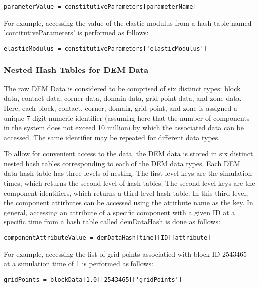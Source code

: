 \begin{lstlisting}[frame=single]
parameterValue = constitutiveParameters[parameterName]
\end{lstlisting}

For example, accessing the value of the elastic modulus from a hash table named 'contitutiveParameters' is performed as follows:

\begin{lstlisting}[frame=single]
elasticModulus = constitutiveParameters['elasticModulus']
\end{lstlisting}


\subsubsection*{Nested Hash Tables for DEM Data}
The raw DEM Data is considered to be comprised of six distinct types: block data, contact data, corner data, domain data, grid point data, and zone data. Here, each block, contact, corner, domain, grid point, and zone is assigned a unique 7 digit numeric identifier (assuming here that the number of components in the system does not exceed 10 million) by which the associated data can be accessed. The same identifier may be repeated for different data types.

To allow for convenient access to the data, the DEM data is stored in six distinct nested hash tables corresponding to each of the DEM data types.  Each DEM data hash table has three levels of nesting. The first level keys are the simulation times, which returns the second level of hash tables. The second level keys are the component identifiers, which returns a third level hash table. In this third level, the component attirbutes can be accessed using the attirbute name as the key. In general, accessing an attribute of a specific component with a given ID at a specific time from a hash table called demDataHash is done as follows:


\begin{lstlisting}[frame=single]
componentAttributeValue = demDataHash[time][ID][attribute]
\end{lstlisting}

For example, accessing the list of grid points associatied with block ID 2543465 at a simulation time of 1 is performed as follows:

\begin{lstlisting}[frame=single]
gridPoints = blockData[1.0][2543465]['gridPoints']
\end{lstlisting}


